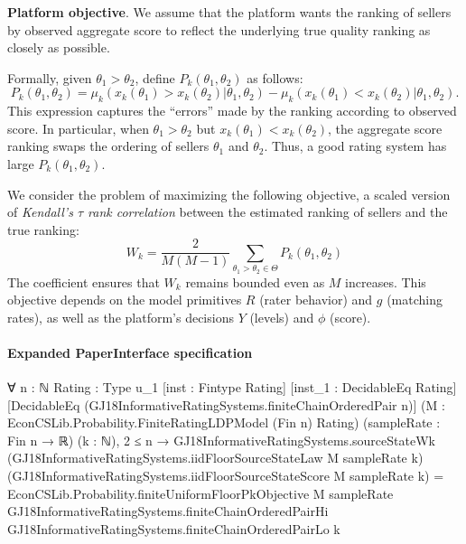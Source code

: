 \documentclass[10pt]{article}
\begin{document}
\begin{ReviewVerbatim}
{\bf Platform objective}.  We assume that the platform wants the ranking of sellers by observed aggregate score to reflect the underlying true quality ranking as closely as possible.

Formally, given $\theta_1 > \theta_2$, define $P_k(\theta_1, \theta_2)$ as follows:
\begin{equation}
\label{eq:Pk}
P_k(\theta_1, \theta_2) = \mu_k(x_k(\theta_1) > x_k(\theta_2)|\theta_1, \theta_2) - \mu_k(x_k(\theta_1) < x_k(\theta_2)|\theta_1, \theta_2).
\end{equation}
This expression captures the ``errors'' made by the ranking according to observed score.  In particular, when $\theta_1 > \theta_2$ but $x_k(\theta_1) < x_k(\theta_2)$, the aggregate score ranking swaps the ordering of sellers $\theta_1$ and $\theta_2$.  Thus, a good rating system has large $P_k(\theta_1, \theta_2)$.

We consider the problem of maximizing the following objective, a scaled version of {\em Kendall's $\tau$ rank correlation} between the estimated ranking of sellers and the true ranking:
\begin{equation}
\label{eq:objective}
W_k = \frac{2}{M(M-1)}\sum_{\theta_1 > \theta_2 \in \Theta} P_k(\theta_1, \theta_2)
\end{equation}
The coefficient ensures that ${W}_k$ remains bounded even as $M$ increases. This objective depends on the model primitives $R$ (rater behavior) and $g$ (matching rates), as well as the platform's decisions $Y$ (levels) and $\phi$ (score).
\end{ReviewVerbatim}


\paragraph{Expanded PaperInterface specification}
\begin{ReviewVerbatim}
∀ {n : ℕ} {Rating : Type u_1} [inst : Fintype Rating] [inst_1 : DecidableEq Rating]
  [DecidableEq (GJ18InformativeRatingSystems.finiteChainOrderedPair n)]
  (M : EconCSLib.Probability.FiniteRatingLDPModel (Fin n) Rating) (sampleRate : Fin n → ℝ) (k : ℕ),
  2 ≤ n →
    GJ18InformativeRatingSystems.sourceStateWk (GJ18InformativeRatingSystems.iidFloorSourceStateLaw M sampleRate k)
        (GJ18InformativeRatingSystems.iidFloorSourceStateScore M sampleRate k) =
      EconCSLib.Probability.finiteUniformFloorPkObjective M sampleRate
        GJ18InformativeRatingSystems.finiteChainOrderedPairHi GJ18InformativeRatingSystems.finiteChainOrderedPairLo k
\end{ReviewVerbatim}
\end{document}
